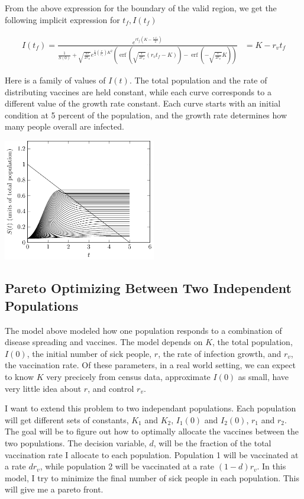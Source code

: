 \documentclass[titlepage]{article}
\DeclareMathOperator\erf{erf}
\begin{document}
From the above expression for the boundary of the valid region,
	we get the following implicit expression for $t_f, I(t_f)$

\begin{align}
I(t_f) =
	\frac{e^{ r t_f (K - \frac{ r_v t_f }{2})}}
	{\frac{1}{S(0)} + \sqrt{\frac{\pi r}{2 r_v}}
		e^{\frac12 \left( \frac{r}{r_v} \right) K^2}
		\left(\erf\left(  \sqrt{\frac{r}{2 r_v}} (r_v t_f - K ) \right)
			- \erf\left( - \sqrt{\frac{r}{2 r_v}} K \right) \right)}
	& = K - r_v t_f
\end{align}

Here is a family of values of $I(t)$.
The total population and the rate of distributing vaccines are
	held constant, while each curve corresponds to a different
	value of the growth rate constant.
Each curve starts with an initial condition at 5 percent of the
	population, and the growth rate determines how many people
	overall are infected.

\includegraphics[width=0.5\textwidth]{figures/vaccination-model-curves-varying-s.pdf}


\subsection{Pareto Optimizing Between Two Independent Populations}

The model above modeled how one population responds to a combination
	of disease spreading and vaccines.
The model depends on $K$, the total population, $I(0)$, the initial
	number of sick people, $r$, the rate of infection growth,
	and $r_v$, the vaccination rate.
Of these parameters, in a real world setting, we can expect to know $K$
	very precicely from census data, approximate $I(0)$ as small,
	have very little idea about $r$, and control $r_v$.

I want to extend this problem to two independant populations.
Each population will get different sets of constants,
	$K_1$ and $K_2$, $I_1(0)$ and $I_2(0)$, $r_1$ and $r_2$.
The goal will be to figure out how to optimally allocate the
	vaccines between the two populations.
The decision variable, $d$, will be the fraction of the total vaccination
	rate I allocate to each population.
Population 1 will be vaccinated at a rate $d r_v$, while population
	2 will be vaccinated at a rate $(1 - d) r_v$.
In this model, I try to minimize the final number of sick people in
	each population.
This will give me a pareto front.
\end{document}
